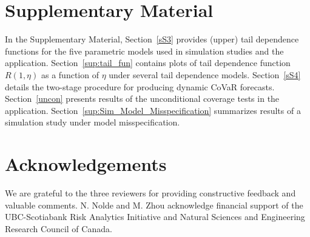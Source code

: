 \documentclass[11pt,letterpaper]{article}
\numberwithin{equation}{section}
\begin{document}
\section*{Supplementary Material}
In the Supplementary Material, Section~\ref{sS3} provides (upper) tail dependence functions for the five parametric models used in simulation studies and the application. Section~\ref{sup:tail_fun} contains plots of tail dependence function $R(1,\eta)$ as a function of $\eta$ under several tail dependence models. Section~\ref{sS4} details the two-stage procedure for producing dynamic CoVaR forecasts. Section~\ref{uncon} presents results of the unconditional coverage tests in the application. Section~\ref{sup:Sim_Model_Misspecification} summarizes results of a simulation study under model misspecification.


\section*{Acknowledgements} We are grateful to the three reviewers for providing constructive feedback and valuable comments. N. Nolde and M. Zhou acknowledge financial support of the UBC-Scotiabank Risk Analytics Initiative and Natural Sciences and Engineering Research Council of Canada. 


 
\end{document}
